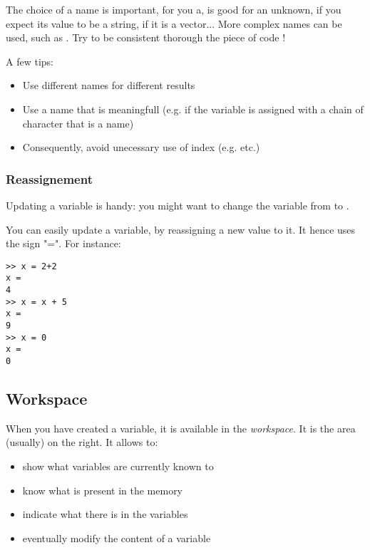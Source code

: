 The choice of a name is important, for you a,  is good for an unknown,  if you expect its value to be a string,  if it is a vector... More complex names can be used, such as . Try to be consistent thorough the piece of code !

A few tips:

\begin{itemize}
	\item Use different names for different results
	\item Use a name that is meaningfull (e.g.  if the variable is assigned with a chain of character that is a name)
	\item Consequently, avoid unecessary use of index (e.g.  etc.)
\end{itemize}



\subsubsection{Reassignement}
Updating a variable is handy: you might want to change the variable  from  to .

You can easily update a variable, by reassigning a new value to it. It hence uses the sign "=".
For instance:
\begin{lstlisting}
>> x = 2+2
x = 
4
>> x = x + 5
x =
9
>> x = 0
x =
0
\end{lstlisting}


\subsection{Workspace}
When you have created a variable, it is available in the \emph{workspace}.
It is the area (usually) on the right.
It allows to:
\begin{itemize}
	\item show what variables are currently known to \matlab
	\item know what is present in the memory
	\item indicate what there is in the variables
	\item eventually modify the content of a variable
\end{itemize}

